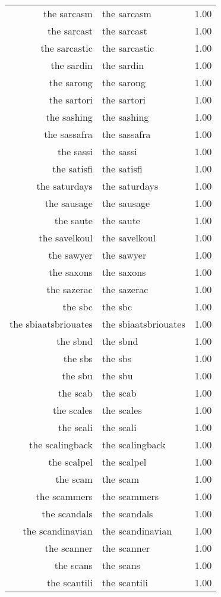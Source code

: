 \begin{table}[ht]
\begin{tabular}{rlr}
  the sarcasm & the sarcasm & 1.00 \\ 
  the sarcast & the sarcast & 1.00 \\ 
  the sarcastic & the sarcastic & 1.00 \\ 
  the sardin & the sardin & 1.00 \\ 
  the sarong & the sarong & 1.00 \\ 
  the sartori & the sartori & 1.00 \\ 
  the sashing & the sashing & 1.00 \\ 
  the sassafra & the sassafra & 1.00 \\ 
  the sassi & the sassi & 1.00 \\ 
  the satisfi & the satisfi & 1.00 \\ 
  the saturdays & the saturdays & 1.00 \\ 
  the sausage & the sausage & 1.00 \\ 
  the saute & the saute & 1.00 \\ 
  the savelkoul & the savelkoul & 1.00 \\ 
  the sawyer & the sawyer & 1.00 \\ 
  the saxons & the saxons & 1.00 \\ 
  the sazerac & the sazerac & 1.00 \\ 
  the sbc & the sbc & 1.00 \\ 
  the sbiaatsbriouates & the sbiaatsbriouates & 1.00 \\ 
  the sbnd & the sbnd & 1.00 \\ 
  the sbs & the sbs & 1.00 \\ 
  the sbu & the sbu & 1.00 \\ 
  the scab & the scab & 1.00 \\ 
  the scales & the scales & 1.00 \\ 
  the scali & the scali & 1.00 \\ 
  the scalingback & the scalingback & 1.00 \\ 
  the scalpel & the scalpel & 1.00 \\ 
  the scam & the scam & 1.00 \\ 
  the scammers & the scammers & 1.00 \\ 
  the scandals & the scandals & 1.00 \\ 
  the scandinavian & the scandinavian & 1.00 \\ 
  the scanner & the scanner & 1.00 \\ 
  the scans & the scans & 1.00 \\ 
  the scantili & the scantili & 1.00 \\ 

\end{tabular}
\end{table}
